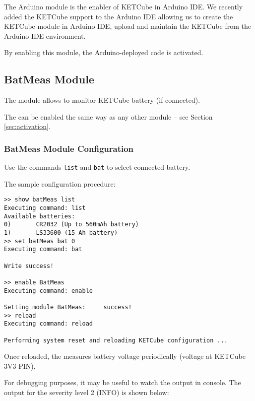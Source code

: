 The Arduino module is the enabler of KETCube in Arduino IDE. We recently added the KETCube support to the Arduino IDE allowing us to create the KETCube module in Arduino IDE, upload and maintain the KETCube from the Arduino IDE environment.

By enabling this module, the Arduino-deployed code is activated.

  
\clearpage
\subsection{BatMeas Module}
  
The  module allows to monitor KETCube battery (if connected). 

The  can be enabled the same way as any other module -- see Section \ref{sec:activation}.

\subsubsection{BatMeas Module Configuration}
  Use the commands {\tt list} and {\tt bat} to select connected battery.
  
  The sample configuration procedure:
  
\begin{docCodeExample}
\begin{verbatim}
>> show batMeas list
Executing command: list
Available batteries:
0)       CR2032 (Up to 560mAh battery)
1)       LS33600 (15 Ah battery)
>> set batMeas bat 0
Executing command: bat

Write success!

>> enable BatMeas
Executing command: enable

Setting module BatMeas:     success!
>> reload
Executing command: reload

Performing system reset and reloading KETCube configuration ...
\end{verbatim}
\end{docCodeExample}

  Once reloaded, the  measures battery voltage periodically (voltage at KETCube 3V3 PIN). 
  
For debugging purposes, it may be useful to watch the  output in console. The output for the severity level 2 (INFO) is shown below:


